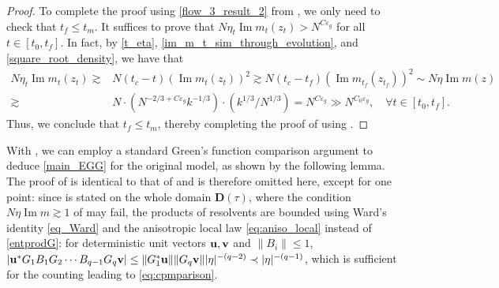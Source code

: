 \documentclass[10pt,reqno]{amsart}
\numberwithin{equation}{section}
\numberwithin{figure}{section}
\theoremstyle{plain} %
\theoremstyle{definition} %
\renewcommand{\leq}{\le}
\newcommand{\pa}[1]{\left({#1}\right)}
\newcommand{\qa}[1]{\left[{#1}\right]}
\DeclareMathOperator{\im}{\mathrm{Im}}
\newcommand{\bu}{{\bf{u}}}
\newcommand{\bv}{{\bf{v}}}
\numberwithin{equation}{section}
\begin{document}
\begin{proof}
To complete the proof using \eqref{flow_3_result_2} from , we only need to check that $t_f\leq t_m$. It suffices to prove that $N\eta_t\im m_t\pa{z_t}> N^{C\varepsilon_g}$ for all $t\in \qa{t_0,t_f}$. In fact, by \eqref{t_eta}, \eqref{im_m_t_sim_through_evolution}, and \eqref{square_root_density}, we have that %
    \begin{equation}\nonumber
        \begin{aligned}
            N\eta_t\im m_t\pa{z_t}\gtrsim& N\pa{t_c-t}\pa{\im m_t\pa{z_t}}^2\gtrsim N\pa{t_c-t_f}\pa{\im m_{t_f}\pa{z_{t_f}}}^2\sim N \eta\im m (z) \\
            \gtrsim& N\cdot \pa{N^{-2/3+C\varepsilon_g}k^{-1/3}}\cdot \pa{k^{1/3}/N^{1/3}}=N^{C\varepsilon_g}\gg N^{C_0\varepsilon_g},\quad \forall t\in\qa{t_0,t_f}.
        \end{aligned}
    \end{equation}
    Thus, we conclude that $t_f\leq t_m$, thereby completing the proof of  using . %
\end{proof}


With , we can employ a standard Green's function comparison argument to deduce \eqref{main_EGG} for the original model, as shown by the following lemma. 
The proof of  is identical to that of \cite[Lemma 3.4]{stone2024randommatrixmodelquantum} and is therefore omitted here, except for one point: since  is stated on the whole domain $\mathbf D(\tau)$, where the condition $N\eta\im m\gtrsim 1$ of  may fail, the products of resolvents are bounded using Ward's identity \eqref{eq_Ward} and the anisotropic local law \eqref{eq:aniso_local} instead of \eqref{entprodG}: for deterministic unit vectors $\bu,\bv$ and $\|B_i\|\le 1$, $|\bu^*G_1B_1G_2\cdots B_{q-1}G_q\bv|\le \|G_1^*\bu\|\|G_q\bv\||\eta|^{-(q-2)}\prec|\eta|^{-(q-1)}$, which is sufficient for the counting leading to \eqref{eq:cpmparison}. 
\end{document}
